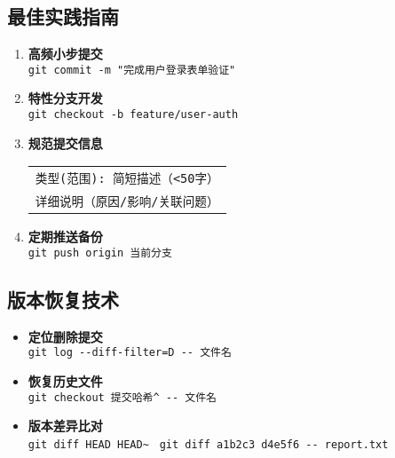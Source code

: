 \subsection{最佳实践指南}
\begin{enumerate}[leftmargin=*, nosep]
    \item \textbf{高频小步提交} \\
    \texttt{git commit -m "完成用户登录表单验证"}
    
    \item \textbf{特性分支开发} \\
    \texttt{git checkout -b feature/user-auth}
    
    \item \textbf{规范提交信息} \\
    \begin{tabular}{@{}l@{}}
        \texttt{类型(范围): 简短描述（<50字）} \\
        \texttt{详细说明（原因/影响/关联问题）}
    \end{tabular}
    
    \item \textbf{定期推送备份} \\
    \texttt{git push origin 当前分支}
\end{enumerate}

\subsection{版本恢复技术}
\begin{itemize}[leftmargin=*, nosep]
    \item \textbf{定位删除提交} \\
    \texttt{git log {-}{-}diff-filter=D {-}{-} 文件名}
    
    \item \textbf{恢复历史文件} \\
    \texttt{git checkout 提交哈希\^{} {-}{-} 文件名}
    
    \item \textbf{版本差异比对} \\
    \texttt{git diff HEAD HEAD\~{} } \quad {} \quad \texttt{git diff a1b2c3 d4e5f6 {-}{-} report.txt}
\end{itemize}

